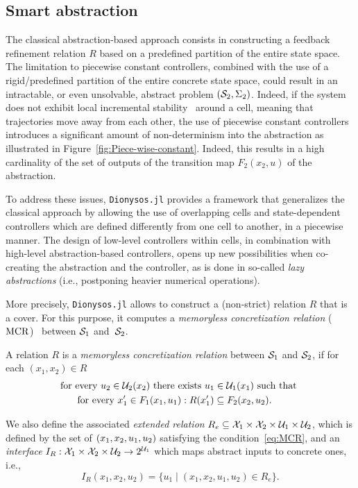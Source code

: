 \documentclass{juliacon}
\begin{document}
\subsection{Smart abstraction} 

The classical abstraction-based approach consists in constructing a feedback refinement relation $R$ based on a predefined partition of the entire state space. 
The limitation to piecewise constant controllers, combined with the use of a rigid/predefined partition of the entire concrete state space, could result in an intractable, or even unsolvable, abstract problem $(\mathcal{S}_2, \Sigma_2)$.
Indeed, if the system does not exhibit local incremental stability~\cite[Definition 2.1]{angeli2002lyapunov}\cite{lohmiller1998contraction} around a cell, meaning that trajectories move away from each other, the use of piecewise constant controllers introduces a significant amount of non-determinism into the abstraction as illustrated in Figure~\ref{fig:Piece-wise-constant}. 
%
Indeed, this results in a high cardinality of the set of 
outputs of the transition map $F_2(x_2,u)$ of the abstraction.
\vskip 6pt

To address these issues, \texttt{Dionysos.jl} provides a framework that generalizes the classical approach by allowing the use of overlapping cells and state-dependent controllers which are defined differently from one cell to another, in a piecewise manner.
The design of low-level controllers within cells, in combination with high-level abstraction-based controllers, opens up new possibilities when co-creating the abstraction and the controller, as is done in so-called \emph{lazy abstractions} (i.e., postponing heavier numerical operations).

\vskip 6pt
More precisely, \texttt{Dionysos.jl} allows to construct a (non-strict) relation $R$ that is a cover.
For this purpose, it computes a \emph{memoryless concretization relation} ($\operatorname{MCR}$)~\cite[Definition 8]{Calbert2024a} between $\mathcal{S}_1$ and~$\mathcal{S}_2$.
\begin{defi}
A relation $R$ is a \emph{memoryless concretization relation} between $\mathcal{S}_1$ and $\mathcal{S}_2$, if for each $(x_1,x_2)\in R$ 
\begin{align}\label{eq:MCR}
    & \text{for every } u_2\in \mathcal{U}_2(x_2) \text{ there exists } u_1\in \mathcal{U}_1(x_1) \text{ such that }\nonumber\\
    & \hspace{0.5cm}\text{ for every }x_1'\in F_1(x_1,u_1): R(x_1')\subseteq F_2(x_2,u_2).
\end{align}
\end{defi}
We also define the associated \emph{extended relation} $R_e\subseteq \mathcal{X}_1\times \mathcal{X}_2\times \mathcal{U}_1\times \mathcal{U}_2$, which is defined by the set of $(x_1, x_2, u_1, u_2)$ satisfying the condition~\eqref{eq:MCR}, and an \emph{interface} $I_R:\mathcal{X}_1\times \mathcal{X}_2\times \mathcal{U}_2 \rightarrow 2^{\mathcal{U}_1}$ which maps abstract inputs to concrete ones, i.e., 
$$I_R(x_1, x_2, u_2)= \{u_1 \mid (x_1,x_2,u_1,u_2)\in R_e\}.$$
\end{document}
